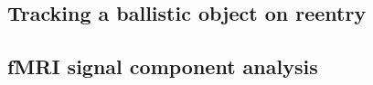 \subsection{Tracking a ballistic object on reentry}
\parencite{ristic2004beyond}
\subsection{fMRI signal component analysis}
\parencite{Sarkka2012}
